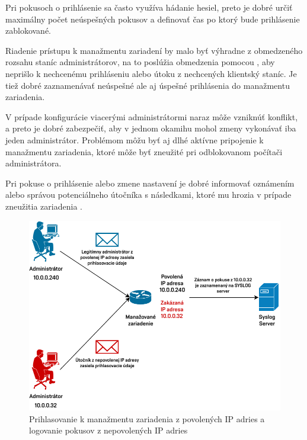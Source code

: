 Pri pokusoch o prihlásenie sa často využíva hádanie hesiel, preto je dobré určiť maximálny počet neúspešných pokusov a definovať čas po ktorý bude prihlásenie zablokované.

Riadenie prístupu k manažmentu zariadení by malo byť výhradne z obmedzeného rozsahu staníc administrátorov, na to poslúžia obmedzenia pomocou , aby neprišlo k nechcenému prihláseniu alebo útoku  z nechcených klientský staníc. Je tiež dobré zaznamenávať neúspešné ale aj úspešné prihlásenia do manažmentu zariadenia. 

V prípade konfigurácie viacerými administrátormi naraz môže vzniknúť konflikt, a preto je dobré zabezpečiť, aby v jednom okamihu mohol zmeny vykonávať iba jeden administrátor. Problémom môžu byť aj dlhé aktívne pripojenie k manažmentu zariadenia, ktoré môže byť zneužité pri odblokovanom počítači administrátora. 

Pri pokuse o prihlásenie alebo zmene nastavení je dobré informovať oznámením alebo správou potenciálneho útočníka s následkami, ktoré mu hrozia v prípade zneužitia zariadenia \cite{CIS_DrTLsgXv24lxeIIM}. 

\begin{figure}[H]
	\begin{center}
		\includegraphics[scale=1]{obrazky/login-log.pdf}
	\end{center}
	\caption[Prihlasovanie k manažmentu zariadenia z povolených IP adries a logovanie pokusov z nepovolených IP adries]{Prihlasovanie k manažmentu zariadenia z povolených IP adries a logovanie pokusov z nepovolených IP adries}
	\label{fig:login-log-mngmt}
\end{figure} 

